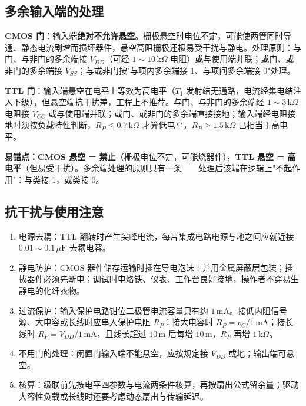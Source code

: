 \subsection{多余输入端的处理}
\textbf{CMOS 门}：输入端\textbf{绝对不允许悬空}。栅极悬空时电位不定，可能使两管同时导通、静态电流剧增而损坏器件，悬空高阻栅极还极易受干扰与静电。处理原则：与门、与非门的多余端接 \(V_{DD}\)（可经 \(1\sim10\,\mathrm{k}\Omega\) 电阻）或与使用端并联；或门、或非门的多余端接 \(V_{SS}\)；与或非门按"与项内多余端接 1、与项间多余端接 0"处理。

\textbf{TTL 门}：输入端悬空在电平上等效为高电平（\(T_1\) 发射结无通路，电流经集电结注入下级），但悬空端抗干扰差，工程上不推荐。与门、与非门的多余端经 \(1\sim3\,\mathrm{k}\Omega\) 电阻接 \(V_{CC}\) 或与使用端并联；或门、或非门的多余端直接接地；输入端经电阻接地时须按负载特性判断，\(R_P\le0.7\,\mathrm{k}\Omega\) 才算低电平，\(R_P\ge1.5\,\mathrm{k}\Omega\) 已相当于高电平。

\textbf{易错点：}\textbf{CMOS 悬空 = 禁止}（栅极电位不定，可能烧器件），\textbf{TTL 悬空 = 高电平}（但易受干扰）。多余端处理的原则只有一条——处理后该端在逻辑上"不起作用"：与类接 1，或类接 0。

\subsection{抗干扰与使用注意}
\begin{enumerate}
    \item 电源去耦：TTL 翻转时产生尖峰电流，每片集成电路电源与地之间应就近接 \(0.01\sim0.1\,\mu\mathrm{F}\) 去耦电容。
    \item 静电防护：CMOS 器件储存运输时插在导电泡沫上并用金属屏蔽层包装；插拔器件必须先断电；调试时电烙铁、仪表、工作台良好接地，操作者不穿易生静电的化纤衣物。
    \item 过流保护：输入保护电路钳位二极管电流容量只有约 \(1\,\mathrm{mA}\)。接低内阻信号源、大电容或长线时应串入保护电阻 \(R_P\)：接大电容时 \(R_P=v_C/1\,\mathrm{mA}\)；接长线时 \(R_P=V_{DD}/1\,\mathrm{mA}\)，且线长超过 \(10\,\mathrm{m}\) 后每增 \(10\,\mathrm{m}\)，\(R_P\) 再增 \(1\,\mathrm{k}\Omega\)。
    \item 不用门的处理：闲置门输入端不能悬空，应按规定接 \(V_{DD}\) 或地；输出端可悬空。
    \item 核算：级联前先按电平四参数与电流两条件核算，再按扇出公式留余量；驱动大容性负载或长线时还要考虑动态扇出与传输延迟。
\end{enumerate}

